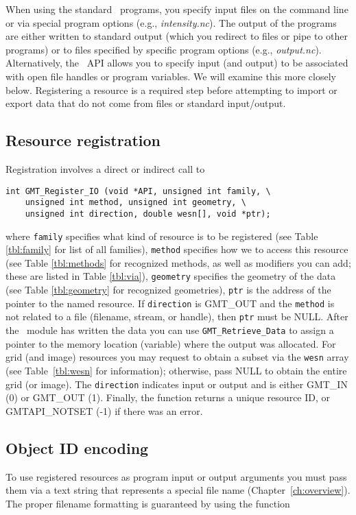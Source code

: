 \documentclass[11pt]{report}
\begin{document}
When using the standard \GMT\ programs, you specify input files on
the command line or via special program options (e.g., \emph{intensity.nc}). The output of
the programs are either written to standard output (which you redirect to files or pipe to other programs)
or to files specified by specific program options (e.g., \emph{output.nc}).  Alternatively, the
\GMT\ API allows you to specify input (and output) to be associated with open file handles
or program variables.  We will examine this more closely below.  Registering a
resource is a required step before attempting to import or export data that do not come from files
or standard input/output.

\subsection{Resource registration}
Registration involves a direct or indirect call to

\begin{verbatim}
int GMT_Register_IO (void *API, unsigned int family, \
    unsigned int method, unsigned int geometry, \
    unsigned int direction, double wesn[], void *ptr);
\end{verbatim}
where \texttt{family} specifies what kind of resource is to be registered
(see Table \ref{tbl:family} for list of all families), \texttt{method} specifies
how we to access this resource (see Table \ref{tbl:methods} for recognized methods,
as well as modifiers you can add; these are listed in Table \ref{tbl:via}),
\texttt{geometry} specifies the geometry of the data (see Table \ref{tbl:geometry} for recognized geometries),
\texttt{ptr} is the address of the pointer to the named resource.  If \texttt{direction}
is GMT\_OUT and the \texttt{method} is not related to a file (filename, stream, or handle),
then \texttt{ptr} must be NULL.  After the \GMT\ module has written the data you can use
\texttt{GMT\_Retrieve\_Data} to assign a pointer to the memory location (variable) where the output was allocated.
For grid (and image) resources you may request to obtain a subset via the \texttt{wesn}
array (see Table~\ref{tbl:wesn} for information); otherwise, pass NULL to obtain the entire grid (or image).
The \texttt{direction} indicates input or output and is either GMT\_IN (0) or GMT\_OUT (1).
Finally, the function returns a unique resource ID, or GMTAPI\_NOTSET (-1) if there was an
error.

\subsection{Object ID encoding}
To use registered resources as program input or output arguments you must pass them via
a text string that represents a special file name (Chapter~\ref{ch:overview}).  The proper filename
formatting is guaranteed by using the function
\index{GMT\_Encode\_ID}
\end{document}
